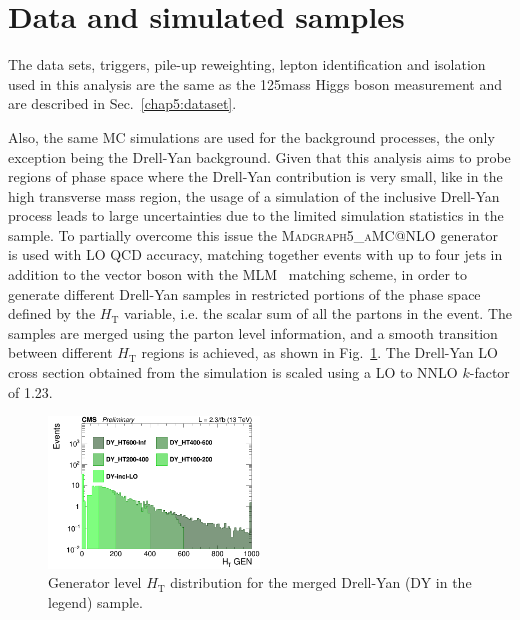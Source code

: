 \section{Data and simulated samples}\label{chap6:datatsets}

The data sets, triggers, pile-up reweighting, lepton identification and isolation used in this analysis are the same as the 125\GeV mass Higgs boson measurement and are described in Sec.~\ref{chap5:dataset}.

Also, the same MC simulations are used for the background processes, the only exception being the Drell-Yan background. Given that this analysis aims to probe regions of phase space where the Drell-Yan contribution is very small, like in the high transverse mass region, the usage of a simulation of the inclusive Drell-Yan process leads to large uncertainties due to the limited simulation statistics in the sample. To partially overcome this issue the \textsc{Madgraph5\_aMC@NLO} generator is used with LO QCD accuracy, matching together events with up to four jets in addition to the vector boson with the MLM~\cite{Alwall:2007fs} matching scheme, in order to generate different Drell-Yan samples in restricted portions of the phase space defined by the $H_\mathrm{T}$ variable, i.e. the scalar sum of all the partons \pt in the event. 
The samples are merged using the parton level information, and a smooth transition between different $H_\mathrm{T}$ regions is achieved, as shown in Fig.~\ref{fig:DY_HT}. The Drell-Yan LO cross section obtained from the simulation is scaled using a LO to NNLO $k$-factor of 1.23.

\begin{figure}[htbp]
\centering
\includegraphics[width=0.5\textwidth]{images/13TeV/log_c_incl_HTGen.png}
\caption{
    Generator level $H_\mathrm{T}$ distribution for the merged Drell-Yan (DY in the legend) sample.}
    \label{fig:DY_HT}
\end{figure}

